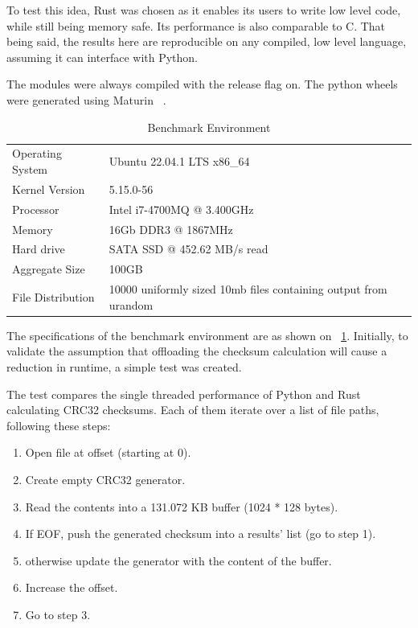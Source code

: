 To test this idea, Rust was chosen as it enables its users to write low level code, while still being memory safe.
Its performance is also comparable to C. That being said, the results here are reproducible on any compiled, low level
language, assuming it can interface with Python.

The modules were always compiled with the release flag on.
The python wheels were generated using Maturin ~\cite{Maturin}.

\begin{table}[]
\begin{tabular}{ll}
Operating System  & Ubuntu 22.04.1 LTS x86\_64                                     \\
Kernel Version    & 5.15.0-56                                                      \\
Processor         & Intel i7-4700MQ @ 3.400GHz                                     \\
Memory            & 16Gb DDR3 @ 1867MHz                                             \\
Hard drive        & SATA SSD @ 452.62 MB/s read                                    \\
Aggregate Size    & 100GB                                                           \\
File Distribution & 10000 uniformly sized 10mb files containing output from urandom
\end{tabular}
\caption{Benchmark Environment}
\label{tab:checksum_tab_1}
\end{table}

The specifications of the benchmark environment are as shown on ~\ref{tab:checksum_tab_1}.
Initially, to validate the assumption that offloading the checksum calculation will cause a reduction
in runtime, a simple test was created.

The test compares the single threaded performance of Python and Rust calculating CRC32 checksums.
Each of them iterate over a list of file paths, following these steps:
\begin{enumerate}
    \item Open file at offset (starting at 0).
    \item Create empty CRC32 generator.
    \item Read the contents into a 131.072 KB buffer (1024 * 128 bytes).
    \item If EOF, push the generated checksum into a results' list (go to step 1).
    \item otherwise update the generator with the content of the buffer.
    \item Increase the offset.
    \item Go to step 3.
\end{enumerate}

